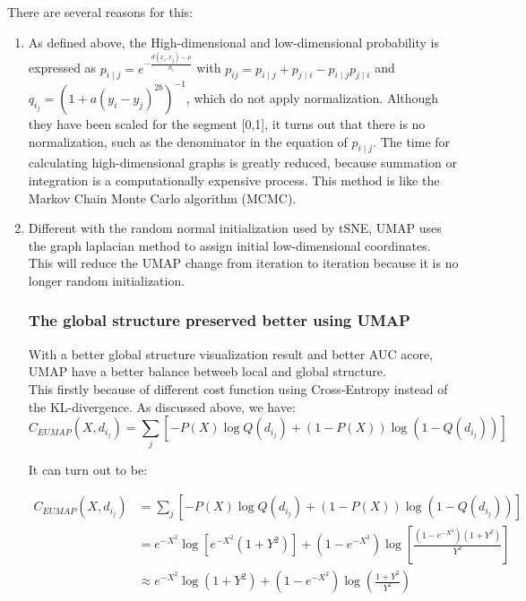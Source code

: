 There are several reasons for this:
\begin{enumerate}[1)]

\item As defined above, the High-dimensional and low-dimensional probability is expressed as $p_{i \mid j} = e^{-\frac{d(x_i,x_j) - \rho}{\sigma_i}}$ with $p_{ij} = p_{i\mid j} + p_{j\mid i} - p_{i\mid j}p_{j\mid i}$ and 
${q_i_j} = (1 + a(y_i - y_j)^{2b} )^{-1}$, which do not apply normalization. Although they have been scaled for the segment [0,1], it turns out that there is no normalization, such as the denominator in the equation of $p_{i \mid j}$. The time for calculating high-dimensional graphs is greatly reduced, because summation or integration is a computationally expensive process. This method is like the Markov Chain Monte Carlo algorithm (MCMC). \\

\item Different with the random normal initialization used by tSNE, UMAP uses the graph laplacian method to assign initial low-dimensional coordinates. This will reduce the UMAP change from iteration to iteration because it is no longer random initialization.\\
   
\subsubsection{The global structure preserved better using UMAP}

With a better global structure visualization result and better AUC acore, UMAP have a better balance betweeb local and global structure.\\

This firstly because of different cost function using Cross-Entropy instead of the KL-divergence. As discussed above, we have:
\begin{equation*}
    C_{EUMAP}(X,d_i_j) = \sum _{j}[-P(X) \log Q(d_i_j) + (1 - P(X)) \log (1-Q(d_i_j))]
\end{equation*}

It can turn out to be:

\begin{equation*}
\begin{aligned}
C_{EUMAP}(X,d_i_j)  &= \sum _{j}[-P(X) \log Q(d_i_j) + (1 - P(X)) \log (1-Q(d_i_j))]\\
&= e^{-X^2} \log \left[ e^{-X^2} (1 + Y^2) \right] + (1 - e^{-X^2}) \log \left[ \frac{ (1 - e^{-X^2})(1 + Y^2)}{Y^2}\right]\\
&\approx e^{-X^2} \log (1 + Y^2) + (1 - e^{-X^2}) \log (\frac{1 + Y^2}{Y^2})
\end{aligned}
\end{equation*}


\end{enumerate}
